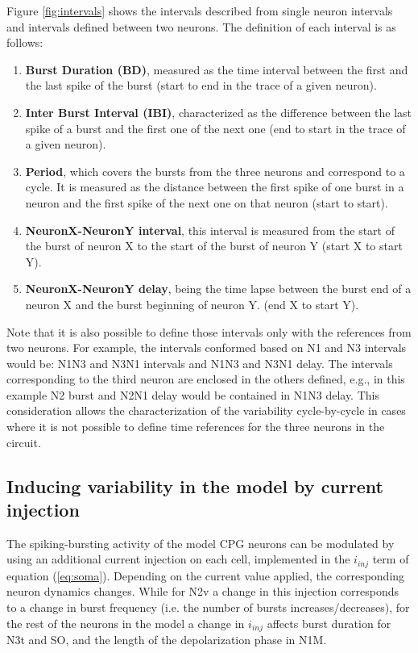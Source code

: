 Figure \ref{fig:intervals} shows the intervals described from single neuron intervals and intervals defined between two neurons. The definition of each interval is as follows:
\begin{enumerate}
	\item \textbf{Burst Duration (BD)}, measured as the time interval between the first and the last spike of the burst (start to end in the trace of a given neuron).
	\item \textbf{Inter Burst Interval (IBI)}, characterized as the difference between the last spike of a burst and the first one of the next one (end to start in the trace of a given neuron).
	\item \textbf{Period}, which covers the bursts from the three neurons and correspond to a cycle. It is measured as the distance between the first spike of one burst in a neuron and the first spike of the next one on that neuron (start to start).
	\item \textbf{NeuronX-NeuronY interval}, this interval is measured from the start of the burst of neuron X to the start of the burst of neuron Y (start X to start Y).
	\item \textbf{NeuronX-NeuronY delay}, being the time lapse between the burst end of a neuron X and the burst beginning of neuron Y. (end X to start Y).
\end{enumerate}

Note that it is also possible to define those intervals only with the references from two neurons. For example, the intervals conformed based on N1 and N3 intervals would be: N1N3 and N3N1 intervals and N1N3 and N3N1 delay. The intervals corresponding to the third neuron are enclosed in the others defined, e.g., in this example N2 burst and N2N1 delay would be contained in N1N3 delay. This consideration allows the characterization of the variability cycle-by-cycle in cases where it is not possible to define time references for the three neurons in the circuit. 

\subsection{Inducing variability in the model by current injection}
\label{subsec:inj protocol}
The spiking-bursting activity of the model CPG neurons can be modulated by using an additional current injection on each cell, implemented in the \(i_{inj}\) term of equation (\ref{eq:soma}). Depending on the current value applied, the corresponding neuron dynamics changes. While for N2v a change in this injection corresponds to a change in burst frequency (i.e. the number of bursts increases/decreases), for the rest of the neurons in the model a change in \(i_{inj}\) affects burst duration for N3t and SO, and the length of the depolarization phase in N1M.


